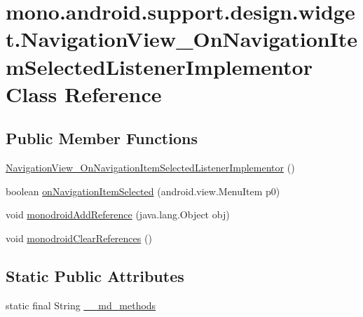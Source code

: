 \hypertarget{classmono_1_1android_1_1support_1_1design_1_1widget_1_1_navigation_view___on_navigation_item_selected_listener_implementor}{
\section{mono.android.support.design.widget.NavigationView\_\-OnNavigationItemSelectedListenerImplementor Class Reference}
\label{classmono_1_1android_1_1support_1_1design_1_1widget_1_1_navigation_view___on_navigation_item_selected_listener_implementor}
}
\subsection*{Public Member Functions}
\begin{CompactItemize}
\item 
\hyperlink{classmono_1_1android_1_1support_1_1design_1_1widget_1_1_navigation_view___on_navigation_item_selected_listener_implementor_ca804c54dd15cf5283107869ae2d1400}{NavigationView\_\-OnNavigationItemSelectedListenerImplementor} ()
\item 
boolean \hyperlink{classmono_1_1android_1_1support_1_1design_1_1widget_1_1_navigation_view___on_navigation_item_selected_listener_implementor_7a1944dd1ff571ff377bd69245bdf594}{onNavigationItemSelected} (android.view.MenuItem p0)
\item 
void \hyperlink{classmono_1_1android_1_1support_1_1design_1_1widget_1_1_navigation_view___on_navigation_item_selected_listener_implementor_8bc0b14e6513bff83883d834a9db2471}{monodroidAddReference} (java.lang.Object obj)
\item 
void \hyperlink{classmono_1_1android_1_1support_1_1design_1_1widget_1_1_navigation_view___on_navigation_item_selected_listener_implementor_5afbcfa48efc997f1eaad7b5f3018d18}{monodroidClearReferences} ()
\end{CompactItemize}
\subsection*{Static Public Attributes}
\begin{CompactItemize}
\item 
static final String \hyperlink{classmono_1_1android_1_1support_1_1design_1_1widget_1_1_navigation_view___on_navigation_item_selected_listener_implementor_30bf6324733fb7eb1ec7e952888ba859}{\_\-\_\-md\_\-methods}
\end{CompactItemize}
